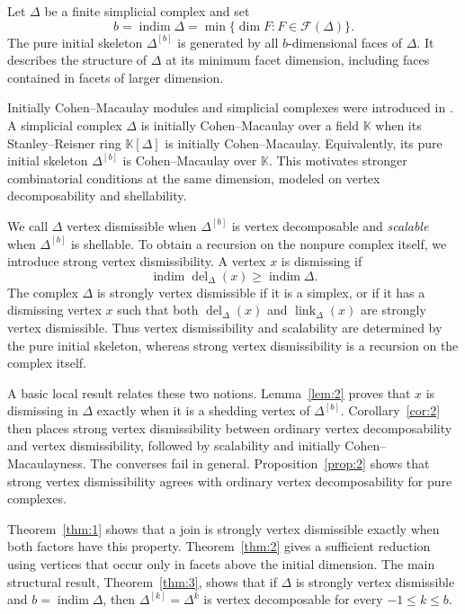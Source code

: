 \documentclass[11pt]{amsart}
\newcommand{\K}{\mathbb K}
\DeclareMathOperator{\indim}{indim}
\DeclareMathOperator{\link}{link}
\DeclareMathOperator{\del}{del}
\theoremstyle{definition}
\begin{document}
	Let $\Delta$ be a finite simplicial complex and set
	\[
	b=\indim\Delta
	=\min\{\dim F:F\in\mathcal F(\Delta)\}.
	\]
	The pure initial skeleton $\Delta^{[b]}$ is generated by all $b$-dimensional faces of $\Delta$. It describes the structure of $\Delta$ at its minimum facet dimension, including faces contained in facets of larger dimension.
	
	Initially Cohen--Macaulay modules and simplicial complexes were introduced in \cite{Namiq2026ICM}. A simplicial complex $\Delta$ is initially Cohen--Macaulay over a field $\K$ when its Stanley--Reisner ring $\K[\Delta]$ is initially Cohen--Macaulay. Equivalently, its pure initial skeleton $\Delta^{[b]}$ is Cohen--Macaulay over $\K$. This motivates stronger combinatorial conditions at the same dimension, modeled on vertex decomposability and shellability.
	
	We call $\Delta$ vertex dismissible when $\Delta^{[b]}$ is vertex decomposable and \emph{scalable} when $\Delta^{[b]}$ is shellable. To obtain a recursion on the nonpure complex itself, we introduce strong vertex dismissibility. A vertex $x$ is dismissing if
	\[
	\indim\del_\Delta(x)\geq\indim\Delta.
	\]
	The complex $\Delta$ is strongly vertex dismissible if it is a simplex, or if it has a dismissing vertex $x$ such that both $\del_\Delta(x)$ and $\link_\Delta(x)$ are strongly vertex dismissible. Thus vertex dismissibility and scalability are determined by the pure initial skeleton, whereas strong vertex dismissibility is a recursion on the complex itself.
	
	A basic local result relates these two notions. Lemma~\ref{lem:2} proves that $x$ is dismissing in $\Delta$ exactly when it is a shedding vertex of $\Delta^{[b]}$. Corollary~\ref{cor:2} then places strong vertex dismissibility between ordinary vertex decomposability and vertex dismissibility, followed by scalability and initially Cohen--Macaulayness. The converses fail in general. Proposition~\ref{prop:2} shows that strong vertex dismissibility agrees with ordinary vertex decomposability for pure complexes.
	
	Theorem~\ref{thm:1} shows that a join is strongly vertex dismissible exactly when both factors have this property. Theorem~\ref{thm:2} gives a sufficient reduction using vertices that occur only in facets above the initial dimension. The main structural result, Theorem~\ref{thm:3}, shows that if $\Delta$ is strongly vertex dismissible and $b=\indim\Delta$, then $\Delta^{[k]}=\Delta^k$ is vertex decomposable for every $-1\leq k\leq b$.
	
\end{document}
